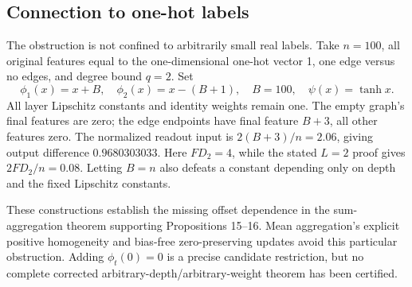 \documentclass[10pt]{article}
\begin{document}
\subsection*{Connection to one-hot labels}
The obstruction is not confined to arbitrarily small real labels. Take \(n=100\), all original features equal to the one-dimensional one-hot vector 1, one edge versus no edges, and degree bound \(q=2\). Set \[\phi_1(x)=x+B,\quad \phi_2(x)=x-(B+1),\quad
 B=100,\quad\psi(x)=\tanh x.\] All layer Lipschitz constants and identity weights remain one. The empty graph’s final features are zero; the edge endpoints have final feature \(B+3\), all other features zero. The normalized readout input is \(2(B+3)/n=2.06\), giving output difference \(0.9680303033\). Here \(FD_2=4\), while the stated \(L=2\) proof gives \(2FD_2/n=0.08\). Letting \(B=n\) also defeats a constant depending only on depth and the fixed Lipschitz constants.\par
These constructions establish the missing offset dependence in the sum-aggregation theorem supporting Propositions 15–16. Mean aggregation’s explicit positive homogeneity and bias-free zero-preserving updates avoid this particular obstruction. Adding \(\phi_t(0)=0\) is a precise candidate restriction, but no complete corrected arbitrary-depth/arbitrary-weight theorem has been certified.\par
\end{document}
